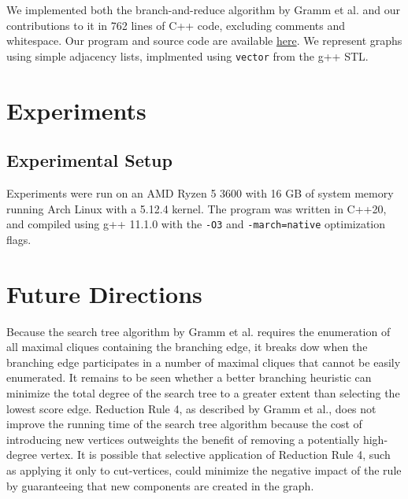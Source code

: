 \documentclass[12pt]{article}
\begin{document}
    We implemented both the branch-and-reduce algorithm by Gramm et al. and our contributions to it in 762 lines of C++ code, excluding comments and whitespace.
    Our program and source code are available \href{https://github.com/kenballus/ecc-reductions}{here}.
    We represent graphs using simple adjacency lists, implmented using \texttt{vector} from the g++ STL.

\section*{Experiments}

\subsection*{Experimental Setup}

    Experiments were run on an AMD Ryzen 5 3600 with 16 GB of system memory running Arch Linux with a 5.12.4 kernel.
    The program was written in C++20, and compiled using g++ 11.1.0 with the \texttt{-O3} and \texttt{-march=native} optimization flags.

\section*{Future Directions}

    Because the search tree algorithm by Gramm et al. requires the enumeration of all maximal cliques containing the branching edge, it breaks dow when the branching edge participates in a number of maximal cliques that cannot be easily enumerated.
    It remains to be seen whether a better branching heuristic can minimize the total degree of the search tree to a greater extent than selecting the lowest score edge.
    Reduction Rule 4, as described by Gramm et al., does not improve the running time of the search tree algorithm because the cost of introducing new vertices outweights the benefit of removing a potentially high-degree vertex.
    It is possible that selective application of Reduction Rule 4, such as applying it only to cut-vertices, could minimize the negative impact of the rule by guaranteeing that new components are created in the graph.
\end{document}
